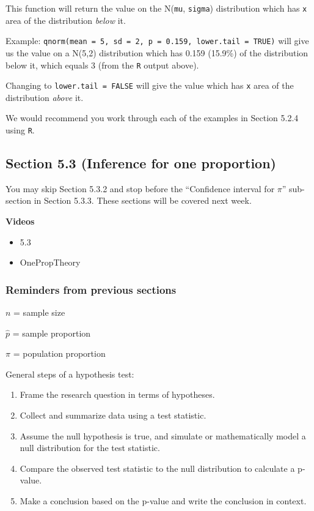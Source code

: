 \documentclass[
]{report}
\providecommand{\tightlist}{%
  \setlength{\itemsep}{0pt}\setlength{\parskip}{0pt}}
\begin{document}
This function will return the value on the N(\texttt{mu}, \texttt{sigma}) distribution which has \texttt{x} area of the distribution \emph{below} it.

Example: \texttt{qnorm(mean\ =\ 5,\ sd\ =\ 2,\ p\ =\ 0.159,\ lower.tail\ =\ TRUE)} will give us the value on a N(5,2) distribution which has 0.159 (15.9\%) of the distribution below it, which equals 3 (from the \texttt{R} output above).

Changing to \texttt{lower.tail\ =\ FALSE} will give the value which has \texttt{x} area of the distribution \emph{above} it.

We would recommend you work through each of the examples in Section 5.2.4 using \texttt{R}.

\hypertarget{section-5.3-inference-for-one-proportion}{%
\subsection*{Section 5.3 (Inference for one proportion)}\label{section-5.3-inference-for-one-proportion}}


You may skip Section 5.3.2 and stop before the ``Confidence interval for \(\pi\)'' sub-section in Section 5.3.3. These sections will be covered next week.

\textbf{Videos}

\begin{itemize}
\tightlist
\item
  5.3
\item
  OnePropTheory
\end{itemize}


\hypertarget{reminders-from-previous-sections}{%
\subsubsection*{Reminders from previous sections}\label{reminders-from-previous-sections}}

\(n\) = sample size

\(\hat{p}\) = sample proportion

\(\pi\) = population proportion

General steps of a hypothesis test:

\begin{enumerate}
\def\labelenumi{\arabic{enumi}.}
\item
  Frame the research question in terms of hypotheses.
\item
  Collect and summarize data using a test statistic.
\item
  Assume the null hypothesis is true, and simulate or mathematically model a null distribution for the test statistic.
\item
  Compare the observed test statistic to the null distribution to calculate a p-value.
\item
  Make a conclusion based on the p-value and write the conclusion in context.
\end{enumerate}
\end{document}
